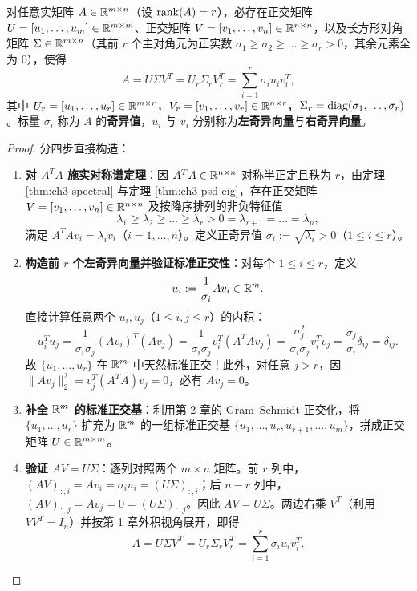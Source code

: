 \begin{thmBox}
\begin{theorem}
\label{thm:ch4-svd}
对任意实矩阵 $A \in \mathbb{R}^{m\times n}$（设 $\operatorname{rank}(A) = r$），必存在正交矩阵 $U = [u_1,\dots,u_m] \in \mathbb{R}^{m\times m}$、正交矩阵 $V = [v_1,\dots,v_n] \in \mathbb{R}^{n\times n}$，以及长方形对角矩阵 $\Sigma \in \mathbb{R}^{m\times n}$（其前 $r$ 个主对角元为正实数 $\sigma_1 \ge \sigma_2 \ge \dots \ge \sigma_r > 0$，其余元素全为 $0$），使得
\begin{equation}
  A = U \Sigma V^T = U_r \Sigma_r V_r^T = \sum_{i=1}^r \sigma_i u_i v_i^T, \label{eq:ch4-svd}
\end{equation}
其中 $U_r = [u_1,\dots,u_r] \in \mathbb{R}^{m\times r}$，$V_r = [v_1,\dots,v_r] \in \mathbb{R}^{n\times r}$，$\Sigma_r = \operatorname{diag}(\sigma_1,\dots,\sigma_r)$。标量 $\sigma_i$ 称为 $A$ 的\textbf{奇异值}，$u_i$ 与 $v_i$ 分别称为\textbf{左奇异向量}与\textbf{右奇异向量}。
\end{theorem}
\end{thmBox}

\begin{proof}
分四步直接构造：
\begin{enumerate}
  \item \textbf{对 $A^T A$ 施实对称谱定理}：因 $A^T A \in \mathbb{R}^{n\times n}$ 对称半正定且秩为 $r$，由定理 \ref{thm:ch3-spectral} 与定理 \ref{thm:ch3-psd-eig}，存在正交矩阵 $V = [v_1,\dots,v_n] \in \mathbb{R}^{n\times n}$ 及按降序排列的非负特征值
  \[
    \lambda_1 \ge \lambda_2 \ge \dots \ge \lambda_r > 0 = \lambda_{r+1} = \dots = \lambda_n,
  \]
  满足 $A^T A v_i = \lambda_i v_i$（$i=1,\dots,n$）。定义正奇异值 $\sigma_i := \sqrt{\lambda_i} > 0$（$1 \le i \le r$）。
  \item \textbf{构造前 $r$ 个左奇异向量并验证标准正交性}：对每个 $1 \le i \le r$，定义
  \[
    u_i := \frac{1}{\sigma_i} A v_i \in \mathbb{R}^m.
  \]
  直接计算任意两个 $u_i, u_j$（$1 \le i, j \le r$）的内积：
  \[
    u_i^T u_j
    = \frac{1}{\sigma_i \sigma_j} (A v_i)^T (A v_j)
    = \frac{1}{\sigma_i \sigma_j} v_i^T (A^T A v_j)
    = \frac{\sigma_j^2}{\sigma_i \sigma_j} v_i^T v_j
    = \frac{\sigma_j}{\sigma_i} \delta_{ij}
    = \delta_{ij}.
  \]
  故 $\{u_1,\dots,u_r\}$ 在 $\mathbb{R}^m$ 中天然标准正交！此外，对任意 $j > r$，因 $\|A v_j\|_2^2 = v_j^T (A^T A) v_j = 0$，必有 $A v_j = 0$。
  \item \textbf{补全 $\mathbb{R}^m$ 的标准正交基}：利用第 2 章的 Gram--Schmidt 正交化，将 $\{u_1,\dots,u_r\}$ 扩充为 $\mathbb{R}^m$ 的一组标准正交基 $\{u_1,\dots,u_r, u_{r+1},\dots,u_m\}$，拼成正交矩阵 $U \in \mathbb{R}^{m\times m}$。
  \item \textbf{验证 $AV = U\Sigma$}：逐列对照两个 $m\times n$ 矩阵。前 $r$ 列中，$(AV)_{:,i} = A v_i = \sigma_i u_i = (U\Sigma)_{:,i}$；后 $n-r$ 列中，$(AV)_{:,j} = A v_j = 0 = (U\Sigma)_{:,j}$。因此 $AV = U\Sigma$。两边右乘 $V^T$（利用 $V V^T = I_n$）并按第 1 章外积视角展开，即得
  \[
    A = U \Sigma V^T = U_r \Sigma_r V_r^T = \sum_{i=1}^r \sigma_i u_i v_i^T.
  \]
\end{enumerate}
\end{proof}


